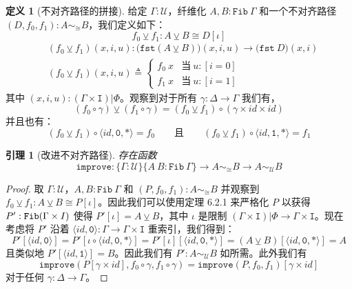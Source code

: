 \documentclass{ctexrep}
\let\mathbb\relax %
\theoremstyle{plain}
\newtheorem{lemma}[theorem]{引理}
\theoremstyle{definition}
\newtheorem{definition}[theorem]{定义}
\theoremstyle{remark}
\begin{document}
\begin{definition}[不对齐路径的拼接]
给定 $\Gamma : \mathcal{U}$，纤维化 $A, B : \mathtt{Fib}\ \Gamma$ 和一个不对齐路径 $(D, f_0, f_1) : A \sim_{\cong} B$，我们定义如下：
$$f_0 \veebar f_1 : A \veebar B \cong D[\iota]$$
\begin{align*}
& (f_0 \veebar f_1)(x,i,u) : \big(\mathtt{fst}(A \veebar B)\big)(x,i,u) \to \big(\mathtt{fst}\ D\big)(x,i) \\
& (f_0 \veebar f_1)(x,i,u) \triangleq \begin{cases} f_0\ x & \text{当}\ u : [i=0] \\ f_1\ x & \text{当}\ u : [i=1] \end{cases}
\end{align*}
其中 $(x,i,u) : (\Gamma \times \mathtt{I})|\Phi$。观察到对于所有 $\gamma : \Delta \to \Gamma$ 我们有，
$$(f_0 \circ \gamma) \veebar (f_1 \circ \gamma) = (f_0 \veebar f_1) \circ (\gamma \times  id  \times  id )$$
并且也有：
$$(f_0 \veebar f_1) \circ \langle  id , \mathtt{0}, * \rangle = f_0 \qquad \text{且} \qquad (f_0 \veebar f_1) \circ \langle  id , \mathtt{1}, * \rangle = f_1$$
\end{definition}

\begin{lemma}[改进不对齐路径]
存在函数
$$\mathtt{improve} : \{\Gamma : \mathcal{U}\}\{A\ B : \mathtt{Fib}\ \Gamma\} \to A \sim_{\cong} B \to A \sim_{\mathcal{U}} B$$
\end{lemma}

\begin{proof}
取 $\Gamma : \mathcal{U}$，$A, B : \mathtt{Fib}\ \Gamma$ 和 $(P, f_0, f_1) : A \sim_{\cong} B$ 并观察到 $f_0 \veebar f_1 : A \veebar B \cong P[\iota]$。因此我们可以使用定理 6.2.1 来严格化 $P$ 以获得 $P' : \mathtt{Fib}(\Gamma \times \mathbb{I})$ 使得 $P'[\iota] = A \veebar B$，其中 $\iota$ 是限制 $(\Gamma \times \mathtt{I})|\Phi \to \Gamma \times \mathtt{I}$。现在考虑将 $P'$ 沿着 $\langle  id , \mathtt{0} \rangle : \Gamma \to \Gamma \times \mathtt{I}$ 重索引，我们得到：
$$P'[\langle  id , \mathtt{0} \rangle] = P'[\iota \circ \langle  id , \mathtt{0}, * \rangle] = P'[\iota][\langle  id , \mathtt{0}, * \rangle] = (A \veebar B)[\langle  id , \mathtt{0}, * \rangle] = A$$
且类似地 $P'[\langle  id , \mathtt{1} \rangle] = B$。因此我们有 $P' : A \sim_{\mathcal{U}} B$ 如所需。此外我们有
$$\mathtt{improve}(P[\gamma \times  id ], f_0 \circ \gamma, f_1 \circ \gamma) = \mathtt{improve}(P, f_0, f_1)[\gamma \times  id ]$$
对于任何 $\gamma : \Delta \to \Gamma$。
\end{proof}
\end{document}
